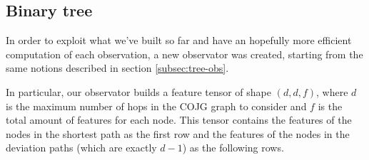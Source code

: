 \documentclass[a4paper,10pt]{report}
\begin{document}
\subsection{Binary tree}\label{subsec:binary-tree-obs}
In order to exploit what we've built so far and have an hopefully more efficient computation of each observation, a new observator was created, starting from the same notions described in section \ref{subsec:tree-obs}. 

In particular, our observator builds a feature tensor of shape $(d, d, f)$, where $d$ is the maximum number of hops in the COJG graph to consider and $f$ is the total amount of features for each node. This tensor contains the features of the nodes in the shortest path as the first row and the features of the nodes in the deviation paths (which are exactly $d-1$) as the following rows.
\end{document}
